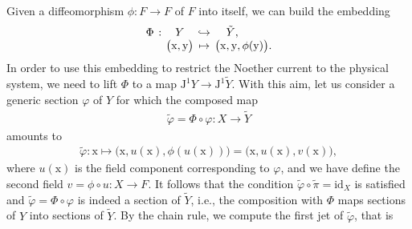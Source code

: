 \documentclass[12pt,a4paper,reqno]{article}
\begin{document}
Given a diffeomorphism $\phi : F \rightarrow F$ of $F$ into itself, we can build the embedding
\begin{align}\label{eq:formal_lagrangians_embedding_geometric}
\arraycolsep=2pt
\begin{array}{rcccl}
\Phi & : & Y & \hookrightarrow & \quad \tilde{Y} , \\
& & \big( {\ensuremath{{\ensuremath{\mathrm{{x}}}}}}, {\ensuremath{{\ensuremath{\mathrm{{y}}}}}} \big) & \mapsto & \big( {\ensuremath{{\ensuremath{\mathrm{{x}}}}}}, {\ensuremath{{\ensuremath{\mathrm{{y}}}}}}, \phi ({\ensuremath{{\ensuremath{\mathrm{{y}}}}}}) \big) .
\end{array}
\end{align}
In order to use this embedding to restrict the Noether current to the physical system, we need to lift $\Phi$ to a map ${\ensuremath{\mathrm{J}}}^{1} Y \rightarrow {\ensuremath{\mathrm{J}}}^{1} \tilde{Y}$.
With this aim, let us consider a generic section ${\ensuremath{\varphi}}$ of $Y$ for which the composed map
\begin{align}
\tilde{\ensuremath{\varphi}} = \Phi \circ {\ensuremath{\varphi}} : X \rightarrow \tilde{Y}
\end{align}
amounts to
\begin{align}
\tilde{\ensuremath{\varphi}} : {\ensuremath{{\ensuremath{\mathrm{{x}}}}}} \mapsto \big( {\ensuremath{{\ensuremath{\mathrm{{x}}}}}} , {\ensuremath{{\ensuremath{{u}}}}} ({\ensuremath{{\ensuremath{\mathrm{{x}}}}}}) , \phi ( {\ensuremath{{\ensuremath{{u}}}}} ({\ensuremath{{\ensuremath{\mathrm{{x}}}}}}) ) \big) = \big( {\ensuremath{{\ensuremath{\mathrm{{x}}}}}} , {\ensuremath{{\ensuremath{{u}}}}} ({\ensuremath{{\ensuremath{\mathrm{{x}}}}}}) , {\ensuremath{{\ensuremath{{v}}}}} ({\ensuremath{{\ensuremath{\mathrm{{x}}}}}}) \big) ,
\end{align}
where ${\ensuremath{{\ensuremath{{u}}}}}({\ensuremath{{\ensuremath{\mathrm{{x}}}}}})$ is the field component corresponding to ${\ensuremath{\varphi}}$, and we have define the second field ${\ensuremath{{\ensuremath{{v}}}}} = \phi \circ {\ensuremath{{\ensuremath{{u}}}}} : X \rightarrow F$.
It follows that the condition $\tilde{\ensuremath{\varphi}} \circ \tilde{\pi} = {\ensuremath{\mathrm{id}}}_{X}$ is satisfied and $\tilde{\ensuremath{\varphi}} = \Phi \circ {\ensuremath{\varphi}}$ is indeed a section of $\tilde{Y}$, i.e., the composition with $\Phi$ maps sections of $Y$ into sections of $\tilde{Y}$.
By the chain rule, we compute the first jet of $\tilde{\ensuremath{\varphi}}$, that is
\end{document}
